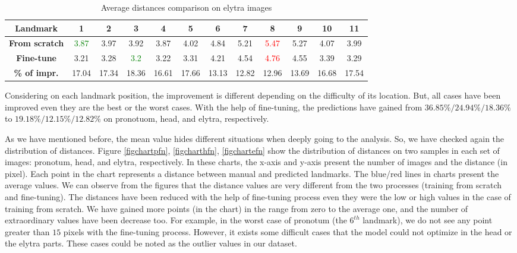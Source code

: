 \documentclass[review]{elsarticle}
\begin{document}
\begin{table}[h!]
	\centering
	\begin{tabular}{| c || c | c | c | c | c | c | c | c | c | c | c |}
		\hline
		\textbf{Landmark} & 1 & 2 & 3 & 4 & 5 & 6 & 7 & 8 & 9 & 10 & 11 \\ \hline \hline
		\textbf{From scratch} & \textcolor{green}{3.87} & 3.97 & 3.92 & 3.87 & 4.02 & 4.84 & 5.21 & \textcolor{red}{5.47} & 5.27 & 4.07 & 3.99 \\ \hline
		\textbf{Fine-tune} & 3.21 & 3.28 & \textcolor{green}{3.2} & 3.22 & 3.31 & 4.21 & 4.54 & \textcolor{red}{4.76} & 4.55 & 3.39 & 3.29 \\ \hline \hline
		\textbf{\% of impr.} & 17.04 & 17.34 & 18.36 & 16.61 & 17.66 & 13.13 & 12.82 & 12.96 & 13.69 & 16.68 & 17.54 \\ \hline
	\end{tabular}
	\caption{Average distances comparison on elytra images}
	\label{tblfn_elytra}
\end{table}

Considering on each landmark position, the improvement is different depending on the difficulty of its location. But, all cases have been improved even they are the best or the worst cases. With the help of fine-tuning, the predictions have gained from $36.85\%/ 24.94\%/ 18.36\%$ to $19.18\%/ 12.15\%/ 12.82\%$ on pronotuom, head, and elytra, respectively.

As we have mentioned before, the mean value hides different situations when deeply going to the analysis. So, we have checked again the distribution of distances. Figure \ref{figchartpfn}, \ref{figcharthfn}, \ref{figchartefn} show the distribution of distances on two samples in each set of images: pronotum, head, and elytra, respectively. In these charts, the x-axis and y-axis present the number of images and the distance (in pixel). Each point in the chart represents a distance between manual and predicted landmarks. The blue/red lines in charts present the average values. We can observe from the figures that the distance values are very different from the two processes (training from scratch and fine-tuning). The distances have been reduced with the help of fine-tuning process even they were the low or high values in the case of training from scratch. We have gained more points (in the chart) in the range from zero to the average one, and the number of extraordinary values have been decrease too. For example, in the worst case of pronotum (the $6^{th}$ landmark), we do not see any point greater than $15$ pixels with the fine-tuning process. However, it exists some difficult cases that the model could not optimize in the head or the elytra parts. These cases could be noted as the outlier values in our dataset.
\end{document}
